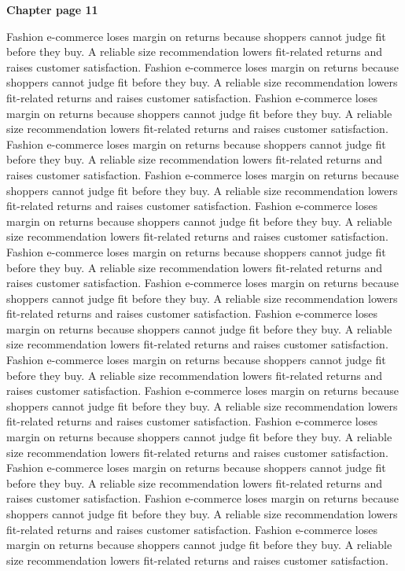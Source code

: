 \documentclass[a4paper,11pt]{article}
\begin{document}
{\headfont\bfseries\Large Chapter page 11}\par\medskip
Fashion e-commerce loses margin on returns because shoppers cannot judge fit before they buy. A reliable size recommendation lowers fit-related returns and raises customer satisfaction. Fashion e-commerce loses margin on returns because shoppers cannot judge fit before they buy. A reliable size recommendation lowers fit-related returns and raises customer satisfaction. Fashion e-commerce loses margin on returns because shoppers cannot judge fit before they buy. A reliable size recommendation lowers fit-related returns and raises customer satisfaction. Fashion e-commerce loses margin on returns because shoppers cannot judge fit before they buy. A reliable size recommendation lowers fit-related returns and raises customer satisfaction. Fashion e-commerce loses margin on returns because shoppers cannot judge fit before they buy. A reliable size recommendation lowers fit-related returns and raises customer satisfaction. 
Fashion e-commerce loses margin on returns because shoppers cannot judge fit before they buy. A reliable size recommendation lowers fit-related returns and raises customer satisfaction. Fashion e-commerce loses margin on returns because shoppers cannot judge fit before they buy. A reliable size recommendation lowers fit-related returns and raises customer satisfaction. Fashion e-commerce loses margin on returns because shoppers cannot judge fit before they buy. A reliable size recommendation lowers fit-related returns and raises customer satisfaction. Fashion e-commerce loses margin on returns because shoppers cannot judge fit before they buy. A reliable size recommendation lowers fit-related returns and raises customer satisfaction. Fashion e-commerce loses margin on returns because shoppers cannot judge fit before they buy. A reliable size recommendation lowers fit-related returns and raises customer satisfaction. 
Fashion e-commerce loses margin on returns because shoppers cannot judge fit before they buy. A reliable size recommendation lowers fit-related returns and raises customer satisfaction. Fashion e-commerce loses margin on returns because shoppers cannot judge fit before they buy. A reliable size recommendation lowers fit-related returns and raises customer satisfaction. Fashion e-commerce loses margin on returns because shoppers cannot judge fit before they buy. A reliable size recommendation lowers fit-related returns and raises customer satisfaction. Fashion e-commerce loses margin on returns because shoppers cannot judge fit before they buy. A reliable size recommendation lowers fit-related returns and raises customer satisfaction. Fashion e-commerce loses margin on returns because shoppers cannot judge fit before they buy. A reliable size recommendation lowers fit-related returns and raises customer satisfaction. \newpage
\end{document}
